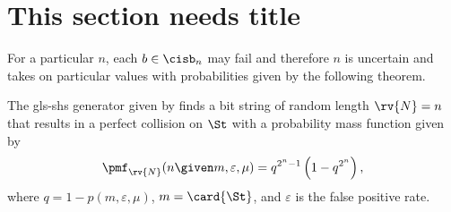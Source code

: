 \documentclass{article}
\begin{document}
\section{This section needs title}
For a particular $n$, each $b \in \cisb_n$ may fail and therefore $n$ is uncertain and takes on particular values with probabilities given by the following theorem.
\begin{theorem}
\label{thm:N_pmf}
The \gls{gls-shs} generator given by  finds a bit string of random length $\rv{N} = n$ that results in a perfect collision on $\St$ with a probability mass function given by
\begin{equation}
\label{eq:N_pmf}
    \pmf_{\rv{N}}(n \given m, \varepsilon, \mu) = q^{2^n-1}\left(1 - q^{2^n}\right),
\end{equation}
where $q = 1 - p(m,\varepsilon,\mu)$, $m = \card{\St}$, and $\varepsilon$ is the false positive rate.
\end{theorem}
\end{document}
